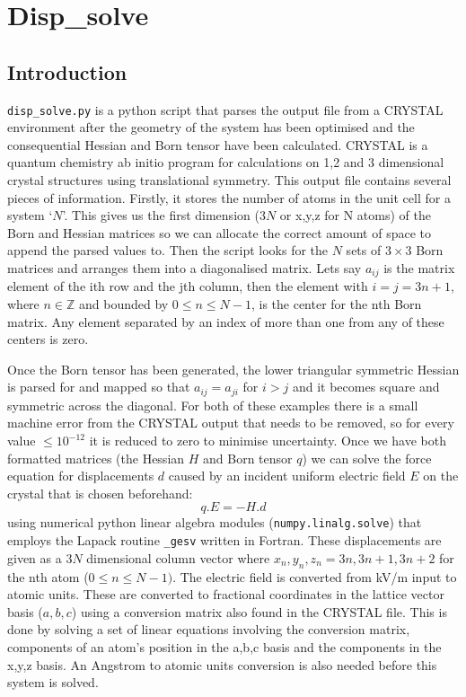 \documentclass[10pt]{article}
\begin{document}
\section{Disp\_solve}
\subsection{Introduction}

\texttt{disp\_solve.py} is a python script that parses the output file from a CRYSTAL environment after the geometry of the system has been optimised and the consequential Hessian and Born tensor have been calculated. CRYSTAL is a quantum chemistry ab initio program for calculations on 1,2 and 3 dimensional crystal structures using translational symmetry. This output file contains several pieces of information. Firstly, it stores the number of atoms in the unit cell for a system `$N$'. This gives us the first dimension ($3N$ or x,y,z for N atoms) of the Born and Hessian matrices so we can allocate the correct amount of space to append the parsed values to. Then the script looks for the $N$ sets of $3\times3$ Born matrices and arranges them into a diagonalised matrix. Lets say $a_{ij}$ is the matrix element of the ith row and the jth column, then the element with $i = j = 3n+1$, where $n \in \mathbb{Z}$ and bounded by $0 \leq n \leq N-1$, is the center for the nth Born matrix. Any element separated by an index of more than one from any of these centers is zero.

Once the Born tensor has been generated, the lower triangular symmetric Hessian is parsed for and mapped so that $a_{ij} = a_{ji}$ for $i > j$ and it becomes square and symmetric across the diagonal. For both of these examples there is a small machine error from the CRYSTAL output that needs to be removed, so for every value $\leq 10^{-12}$ it is reduced to zero to minimise uncertainty. Once we have both formatted matrices (the Hessian $H$ and Born tensor $q$) we can solve the force equation for displacements $d$ caused by an incident uniform electric field $E$ on the crystal that is chosen beforehand:
\begin{equation*}
	q.E = -H.d
\end{equation*}
using numerical python linear algebra modules (\texttt{numpy.linalg.solve}) that employs the Lapack routine \texttt{\_gesv} written in Fortran. These displacements are given as a $3N$ dimensional column vector where $x_n,y_n,z_n = 3n, 3n+1, 3n+2$ for the nth atom ($0\leq n \leq N-1)$. The electric field is converted from kV/m input to atomic units. These are converted to fractional coordinates in the lattice vector basis ($a,b,c$) using a conversion matrix also found in the CRYSTAL file. This is done by solving a set of linear equations involving the conversion matrix, components of an atom's position in the a,b,c basis and the components in the x,y,z basis. An Angstrom to atomic units conversion is also needed before this system is solved.
\end{document}
